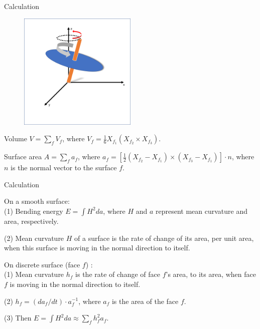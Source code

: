 \documentclass[10pt]{beamer}
\begin{document}
\begin{frame}{Calculation}
\begin{figure}
	\vspace{-24pt}
	\centering
	\includegraphics[width=0.5\textwidth]{sphere1.png}
\end{figure}
Volume $V = \sum_{f} V_{f} $, where $V_{f} = \frac{1}{6} X_{f_1} (X_{f_2} \times X_{f_3})$.

\vspace{5mm}

Surface area $A =  \sum_{f} a_{f}$, where $a_{f} =  [\frac{1}{2}(X_{f_2}-X_{f_1}) \times (X_{f_3}-X_{f_1})] \cdot n$, where $n$ is the normal vector to the surface $f$.


\end{frame}


\begin{frame}{Calculation}

On a smooth surface:\\
(1) Bending energy $E = \int H^2 da$, where $H$ and $a$ represent mean curvature and area, respectively.

(2) Mean curvature $H$ of a surface is the rate of change of its area, per unit area, when this surface is moving in the normal direction to itself.

\vspace{5mm}

On discrete surface (face $f$) :\\
(1) Mean curvature $h_{f}$ is the rate of change of face $f$'s area, to its area, when face $f$ is moving in the normal direction to itself.

(2) $h_{f} = (da_{f}/dt)\cdot a_{f}^{-1}$, where $a_{f}$ is the area of the face $f$.

(3) Then $E = \int H^2 da \approx \sum_{f} h_{f}^2a_{f}$.
\end{frame}
\end{document}
